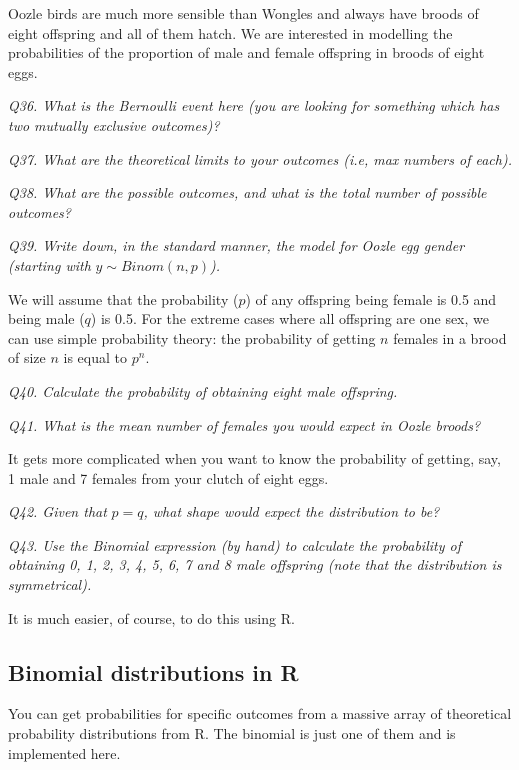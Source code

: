 \documentclass[
  11pt,
  a4paper,
]{book}
\begin{document}
Oozle birds are much more sensible than Wongles and always have broods of eight offspring and all of them hatch. We are interested in modelling the probabilities of the proportion of male and female offspring in broods of eight eggs.

\emph{Q36. What is the Bernoulli event here (you are looking for something which has two mutually exclusive outcomes)?}

\emph{Q37. What are the theoretical limits to your outcomes (i.e, max numbers of each).}

\emph{Q38. What are the possible outcomes, and what is the total number of possible outcomes?}

\emph{Q39. Write down, in the standard manner, the model for Oozle egg gender (starting with} \(y \sim Binom(n,p)\)\emph{).}

We will assume that the probability (\(p\)) of any offspring being female is 0.5 and being male (\(q\)) is 0.5. For the extreme cases where all offspring are one sex, we can use simple probability theory: the probability of getting \(n\) females in a brood of size \(n\) is equal to \(p^n\).

\emph{Q40. Calculate the probability of obtaining eight male offspring.}

\emph{Q41. What is the mean number of females you would expect in Oozle broods?}

It gets more complicated when you want to know the probability of getting, say, 1 male and 7 females from your clutch of eight eggs.

\emph{Q42. Given that} \(p=q\)\emph{, what shape would expect the distribution to be?}

\emph{Q43. Use the Binomial expression (by hand) to calculate the probability of obtaining 0, 1, 2, 3, 4, 5, 6, 7 and 8 male offspring (note that the distribution is symmetrical).}

It is much easier, of course, to do this using R.

\hypertarget{binomial-distributions-in-r}{%
\subsection{Binomial distributions in R}\label{binomial-distributions-in-r}}

You can get probabilities for specific outcomes from a massive array of theoretical probability distributions from R. The binomial is just one of them and is implemented here.
\end{document}
